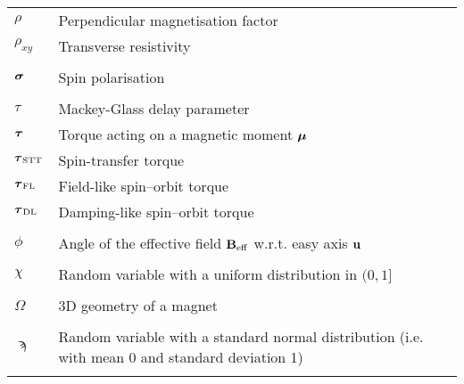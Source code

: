 \begin{longtable}[l]{p{60pt} p{350pt}}
	$\rho$ & Perpendicular magnetisation factor \\
	$\rho_{xy}$ & Transverse resistivity \\
	&\\
	
	$\boldsymbol{\mathbf{\sigma}}$ & Spin polarisation \\
	&\\

	$\tau$ & Mackey-Glass delay parameter \\
	$\boldsymbol{\mathbf{\tau}}$ & Torque acting on a magnetic moment $\boldsymbol{\mathbf{\mu}}$ \\
	$\boldsymbol{\mathbf{\tau}}_\mathrm{STT}$ & Spin-transfer torque \\
	$\boldsymbol{\mathbf{\tau}}_\mathrm{FL}$ & Field-like spin--orbit torque \\
	$\boldsymbol{\mathbf{\tau}}_\mathrm{DL}$ & Damping-like spin--orbit torque \\
	&\\

	$\phi$ & Angle of the effective field $\boldsymbol{\mathbf{B}}_\mathrm{eff}$ w.r.t. easy axis $\boldsymbol{\mathbf{u}}$ \\
	&\\

	$\chi$ & Random variable with a uniform distribution in $(0, 1]$ \\
	&\\
	
	$\Omega$ & 3D geometry of a magnet \\
	&\\
	
	$\sampi$ & Random variable with a standard normal distribution (i.e. with mean 0 and standard deviation 1) \\
	&\\
\end{longtable}

